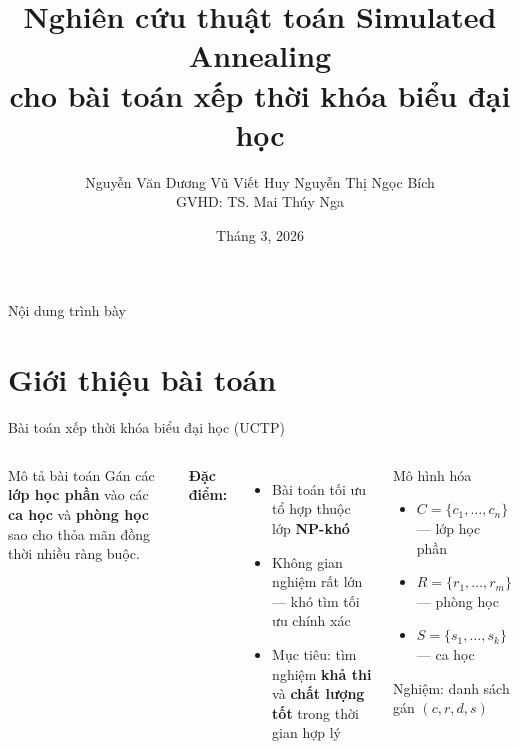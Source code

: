 \documentclass[aspectratio=169,10pt]{beamer}
\title[SA cho bài toán xếp TKB]{Nghiên cứu thuật toán Simulated Annealing\\cho bài toán xếp thời khóa biểu đại học}
\author[Nguyễn Văn Dương]{%
  Nguyễn Văn Dương \quad Vũ Viết Huy \quad Nguyễn Thị Ngọc Bích\\[6pt]
  {\small GVHD: TS. Mai Thúy Nga}%
}
\institute[Phenikaa]{Trường Đại học Phenikaa\\Khoa Công nghệ thông tin}
\date{Tháng 3, 2026}
\begin{document}
\begin{frame}[plain]
\titlepage
\end{frame}

\begin{frame}{Nội dung trình bày}
\tableofcontents
\end{frame}

\section{Giới thiệu bài toán}

\begin{frame}{Bài toán xếp thời khóa biểu đại học (UCTP)}
\begin{columns}[T]
\begin{block}{Mô tả bài toán}
Gán các \textbf{lớp học phần} vào các \textbf{ca học} và \textbf{phòng học} sao cho thỏa mãn đồng thời nhiều ràng buộc.
\end{block}

\vspace{0.3cm}
\textbf{Đặc điểm:}
\begin{itemize}
  \item Bài toán tối ưu tổ hợp thuộc lớp \textbf{NP-khó}
  \item Không gian nghiệm rất lớn --- khó tìm tối ưu chính xác
  \item Mục tiêu: tìm nghiệm \textbf{khả thi} và \textbf{chất lượng tốt} trong thời gian hợp lý
\end{itemize}

\begin{block}{Mô hình hóa}
\begin{itemize}
  \item $C = \{c_1, \ldots, c_n\}$ --- lớp học phần
  \item $R = \{r_1, \ldots, r_m\}$ --- phòng học
  \item $S = \{s_1, \ldots, s_k\}$ --- ca học
\end{itemize}
\vspace{0.2cm}
Nghiệm: danh sách gán $(c, r, d, s)$
\end{block}
\end{columns}
\end{frame}
\end{document}
